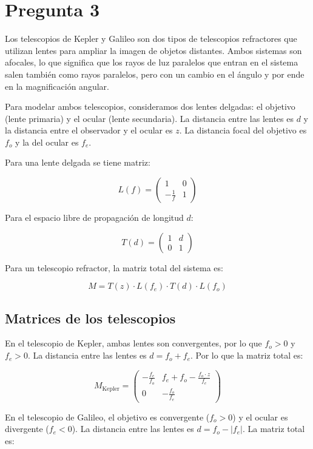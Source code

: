 \documentclass[11pt]{article}
\begin{document}
\section*{Pregunta 3}

Los telescopios de Kepler y Galileo son dos tipos de telescopios refractores que utilizan lentes para ampliar la imagen de objetos distantes. Ambos sistemas son afocales, lo que significa que los rayos de luz paralelos que entran en el sistema salen también como rayos paralelos, pero con un cambio en el ángulo y por ende en la magnificación angular.

Para modelar ambos telescopios, consideramos dos lentes delgadas: el objetivo (lente primaria) y el ocular (lente secundaria). La distancia entre las lentes es \(d\) y la distancia entre el observador y el ocular es \(z\). La distancia focal del objetivo es \(f_o\) y la del ocular es \(f_e\).

Para una lente delgada se tiene matriz:

\[L(f) = \begin{pmatrix} 1 & 0 \\ -\frac{1}{f} & 1 \end{pmatrix}\]

Para el espacio libre de propagación de longitud \(d\):

\[T(d) = \begin{pmatrix} 1 & d \\ 0 & 1 \end{pmatrix}\]

Para un telescopio refractor, la matriz total del sistema es:

\[M = T(z) \cdot L(f_e) \cdot T(d) \cdot L(f_o)\]

\subsection*{Matrices de los telescopios}

En el telescopio de Kepler, ambas lentes son convergentes, por lo que \(f_o > 0\) y \(f_e > 0\). La distancia entre las lentes es \(d = f_o + f_e\). Por lo que la matriz total es:

\[
M_{\text{Kepler}} = \begin{pmatrix} -\frac{f_e}{f_o} & f_e + f_o - \frac{f_o \cdot z}{f_e} \\ 0 & -\frac{f_o}{f_e} \end{pmatrix}
\]

En el telescopio de Galileo, el objetivo es convergente (\(f_o > 0\)) y el ocular es divergente (\(f_e < 0\)). La distancia entre las lentes es \(d = f_o - |f_e|\). La matriz total es:
\end{document}
